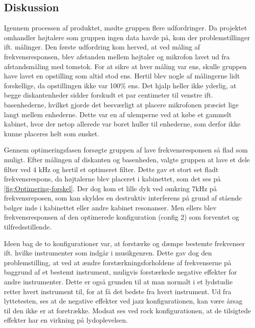 \subsection{Diskussion}
Igennem processen af produktet, mødte gruppen flere udfordringer. Da projektet omhandler højtalere som gruppen ingen data havde på, kom der problemstillinger ift. målinger. Den første udfordring kom herved, at ved måling af frekvensresponsen, blev afstanden mellem højtaler og mikrofon lavet ud fra afstandsmåling med tomstok. For at sikre at hver måling var ens, skulle gruppen have lavet en opstilling som altid stod ens. Hertil blev nogle af målingerne lidt forskellige, da opstillingen ikke var 100\% ens. Det hjalp heller ikke yderlig, at begge diskantenheder sidder forskudt et par centimeter til venstre ift. basenhederne, hvilket gjorde det besværligt at placere mikrofonen præcist lige langt mellem enhederne. Dette var en af ulemperne ved at købe et gammelt kabinet, hvor der netop allerede var boret huller til enhederne, som derfor ikke kunne placeres helt som ønsket. 


Gennem optimeringsfasen forsøgte gruppen af lave frekvensresponsen så flad som muligt. Efter målingen af diskanten og basenheden, valgte gruppen at lave et dele filter ved 4 kHz og hertil et optimeret filter. Dette gav et stort set fladt frekvensrespons, da højtalerne blev placeret i kabinettet, som det ses på  \autoref{fig:Optimering-forskel}. Der dog kom et lille dyk ved omkring 7kHz på frekvensreposen, som kan skyldes en destruktiv interferens på grund af stående bølger inde i kabinettet eller andre kabinet resonanser. Men ellers blev frekvensresponsen af den optimerede konfiguration (config 2) som forventet og tilfredsstillende. 

Ideen bag de to konfigurationer var, at forstærke og dæmpe bestemte frekvenser ift. hvilke instrumenter som indgår i musikgenren. Dette gav dog den problemstilling, at ved at ændre forstærkningsforholdene af frekvenserne på baggrund af et bestemt instrument, muligvis forstærkede negative effekter for andre instrumenter. Dette er også grunden til at man normalt i et lydstudie retter hvert instrument til, for at få det bedste fra hvert instrument. Ud fra lyttetesten, ses at de negative effekter ved jazz konfigurationen, kan være årsag til den ikke er at foretrække. Modsat ses ved rock konfigurationen, at de tilsigtede effekter har en virkning på lydoplevelsen. 

